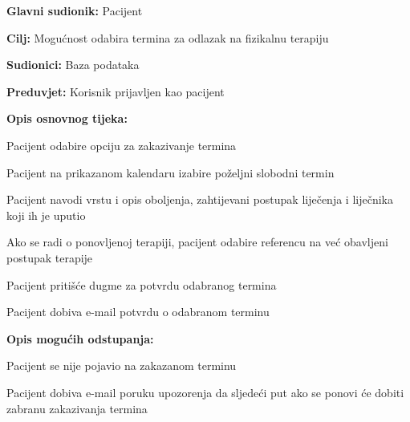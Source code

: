 					\noindent {}
					\begin{packed_item}
						
						\item \textbf{Glavni sudionik: }Pacijent
						\item  \textbf{Cilj:} Mogućnost odabira termina za odlazak na fizikalnu terapiju
						\item  \textbf{Sudionici:} Baza podataka
						\item  \textbf{Preduvjet:} Korisnik prijavljen kao pacijent
						\item  \textbf{Opis osnovnog tijeka:}
						
						\item[] \begin{packed_enum}
							
							\item Pacijent odabire opciju za zakazivanje termina
							\item Pacijent na prikazanom kalendaru izabire poželjni slobodni termin
							\item Pacijent navodi vrstu i opis oboljenja, zahtijevani postupak liječenja i liječnika koji ih je uputio
							\item Ako se radi o ponovljenoj terapiji, pacijent odabire referencu na već obavljeni postupak terapije
							\item Pacijent pritišće dugme za potvrdu odabranog termina
							\item Pacijent dobiva e-mail potvrdu o odabranom terminu
						\end{packed_enum}
						
						\item  \textbf{Opis mogućih odstupanja:}
						
						\item[] \begin{packed_item}
							
							\item[2.a] Pacijent se nije pojavio na zakazanom terminu
							\item[] \begin{packed_enum}
								
								\item Pacijent dobiva e-mail poruku upozorenja da sljedeći put ako se ponovi će dobiti zabranu zakazivanja termina
								
							\end{packed_enum}
							

\end{packed_item}
\end{packed_item}
